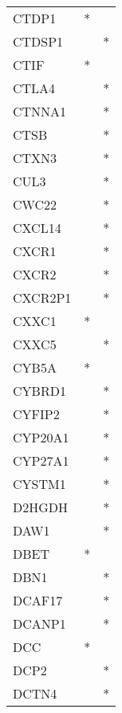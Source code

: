 \begin{longtable}{lcc}
CTDP1           &              * &            \\
CTDSP1          &                &          * \\
CTIF            &              * &            \\
CTLA4           &                &          * \\
CTNNA1          &                &          * \\
CTSB            &                &          * \\
CTXN3           &                &          * \\
CUL3            &                &          * \\
CWC22           &                &          * \\
CXCL14          &                &          * \\
CXCR1           &                &          * \\
CXCR2           &                &          * \\
CXCR2P1         &                &          * \\
CXXC1           &              * &            \\
CXXC5           &                &          * \\
CYB5A           &              * &            \\
CYBRD1          &                &          * \\
CYFIP2          &                &          * \\
CYP20A1         &                &          * \\
CYP27A1         &                &          * \\
CYSTM1          &                &          * \\
D2HGDH          &                &          * \\
DAW1            &                &          * \\
DBET            &              * &            \\
DBN1            &                &          * \\
DCAF17          &                &          * \\
DCANP1          &                &          * \\
DCC             &              * &            \\
DCP2            &                &          * \\
DCTN4           &                &          * \\

\end{longtable}
